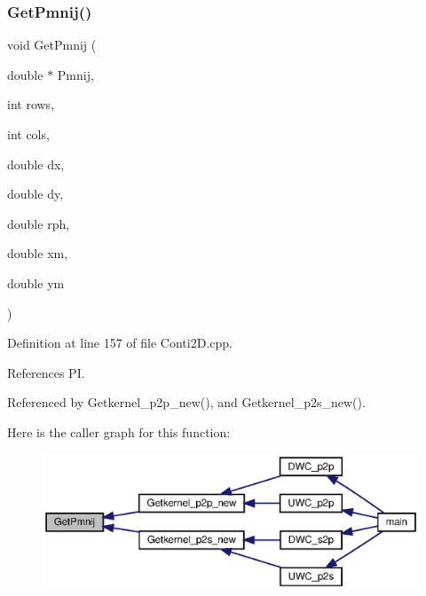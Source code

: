 \mbox{\label{Conti2D_8h_a4bb34ae88cf16e429505f9eb746384cd_a4bb34ae88cf16e429505f9eb746384cd}} 
\subsubsection{Get\+Pmnij()}
{\footnotesize\ttfamily void Get\+Pmnij (\begin{DoxyParamCaption}\item[{double $\ast$}]{Pmnij,  }\item[{int}]{rows,  }\item[{int}]{cols,  }\item[{double}]{dx,  }\item[{double}]{dy,  }\item[{double}]{rph,  }\item[{double}]{xm,  }\item[{double}]{ym }\end{DoxyParamCaption})}



Definition at line 157 of file Conti2\+D.\+cpp.



References PI.



Referenced by Getkernel\+\_\+p2p\+\_\+new(), and Getkernel\+\_\+p2s\+\_\+new().

Here is the caller graph for this function\+:\nopagebreak
\begin{figure}[H]
\begin{center}
\leavevmode
\includegraphics[width=350pt]{Conti2D_8h_a4bb34ae88cf16e429505f9eb746384cd_a4bb34ae88cf16e429505f9eb746384cd_icgraph}
\end{center}
\end{figure}
\mbox{\label{Conti2D_8h_ae9ea2d2408945cb9ad31ee7f03ca183a_ae9ea2d2408945cb9ad31ee7f03ca183a}} 

